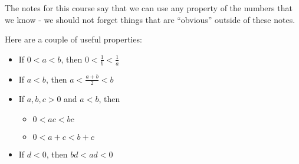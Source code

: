 \documentclass{article}
\begin{document}
The notes for this course say that we can use any property of the numbers that we know - we should not forget things that are ``obvious'' outside of these notes.

Here are a couple of useful properties:

\begin{itemize}
\item
If $0 < a < b$, then $0 < \frac{1}{b} < \frac{1}{a}$

\item
If $a < b$, then $a < \frac{a + b}{2} < b$

\item
If $a, b, c > 0$ and $a < b$, then
\begin{itemize}
\item $0 < ac < bc$
\item $0 < a + c < b + c$
\end{itemize}

\item
If $d < 0$, then $bd < ad < 0$
\end{itemize}
\end{document}
